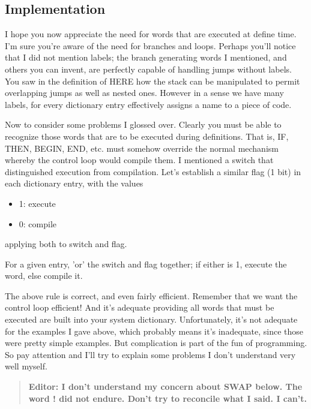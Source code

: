 \documentclass[b5paper, oneside]{book}
\begin{document}
\subsection{Implementation}
I hope you now appreciate the need for words that are executed at define time. I'm sure you're aware of the need for branches and loops. Perhaps you'll notice that I did not mention labels; the branch generating words I mentioned, and others you can invent, are perfectly capable of handling jumps without labels. You saw in the definition of HERE how the stack can be manipulated to permit overlapping jumps as well as nested ones. However in a sense we have many labels, for every dictionary entry effectively assigns a name to a piece of code.

Now to consider some problems I glossed over. Clearly you must be able to recognize those words that are to be executed during definitions. That is, IF, THEN, BEGIN, END, etc. must somehow override the normal mechanism whereby the control loop would compile them. I mentioned a switch that distinguished execution from compilation. Let's establish a similar flag (1 bit) in each dictionary entry, with the values\begin{itemize}
   \item 1: execute
   \item 0: compile\end{itemize}
applying both to switch and flag.

For a given entry, 'or' the switch and flag together; if either is 1, execute the word, else compile it.

The above rule is correct, and even fairly efficient. Remember that we want the control loop efficient! And it's adequate providing all words that must be executed are built into your system dictionary. Unfortunately, it's not adequate for the examples I gave above, which probably means it's inadequate, since those were pretty simple examples. But complication is part of the fun of programming. So pay attention and I'll try to explain some problems I don't understand very well myself.

\begin{quote}
\textbf{Editor: I don't understand my concern about SWAP below. The word ! did not endure. Don't try to reconcile what I said. I can't.}
\end{quote}
\end{document}
